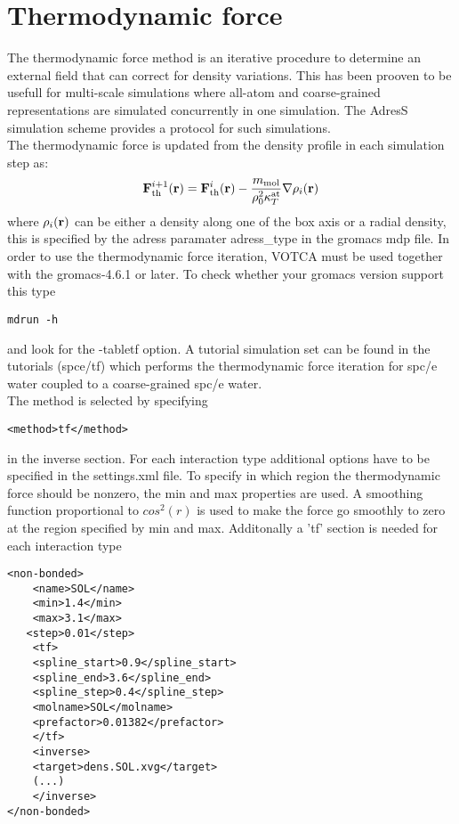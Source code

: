 \section{Thermodynamic force}
The thermodynamic force method is an iterative procedure to determine an external field that can correct for density variations. This has been prooven to be usefull for multi-scale simulations where all-atom and coarse-grained representations are simulated concurrently in one simulation. The AdresS simulation scheme provides a protocol for such simulations.\\
The thermodynamic force is updated from the density profile in each simulation step as:
\begin{equation}
  {\bf F}_\text{th}^{i+1}({\bf r}) = {\bf F}_\text{th}^i({\bf r}) - \frac{m_\text{mol}}{\rho_0^2 \kappa_T^\text{at}}\nabla \rho_i({\bf r})
\label{iterative_force_grad_dens}
\end{equation}
where $\rho_i({\bf r})$ can be either a density along one of the box axis or a radial density, this is specified by the adress paramater adress\_type in the gromacs mdp file.
In order to use the thermodynamic force iteration, VOTCA must be used together with the gromacs-4.6.1 or later. To check whether your gromacs version support this type \begin{verbatim}mdrun -h \end{verbatim} and look for the -tabletf option.
A tutorial simulation set can be found in the tutorials (spce/tf) which performs the thermodynamic force iteration for spc/e water coupled to a coarse-grained spc/e water.\\
The method is selected by specifying
\begin{lstlisting}
<method>tf</method>
\end{lstlisting}
in the inverse section.
For each interaction type additional options have to be specified in the settings.xml file. To specify in which region the thermodynamic force should be nonzero, the min and max properties are used.
A smoothing function proportional to $cos^2(r)$ is used to make the force go smoothly to zero at the region specified by min and max.
Additonally a 'tf' section is needed for each interaction type
\begin{lstlisting}
<non-bonded>
    <name>SOL</name>
    <min>1.4</min>
    <max>3.1</max>
   <step>0.01</step>
    <tf>
	<spline_start>0.9</spline_start>
	<spline_end>3.6</spline_end>
	<spline_step>0.4</spline_step>
	<molname>SOL</molname>
	<prefactor>0.01382</prefactor>
    </tf>
    <inverse>
	<target>dens.SOL.xvg</target>
	(...)
    </inverse>
</non-bonded>
\end{lstlisting}
